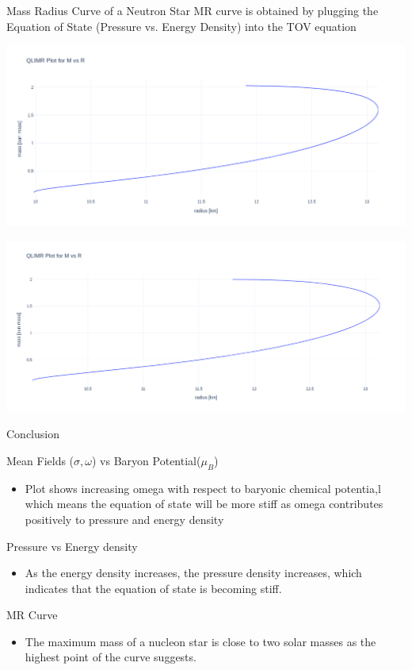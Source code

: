 \documentclass[12pt,aspectratio169]{beamer}
\begin{document}
\begin{frame}{Mass Radius Curve of a Neutron Star}
MR curve is obtained by plugging the Equation of State (Pressure vs. Energy Density) into the TOV equation\\
\vspace{1cm}
\begin{minipage}[t]{0.48\textwidth}
  \centering
  \includegraphics[width=0.9\linewidth]{MR1.png}
\end{minipage}
\hfill
\begin{minipage}[t]{0.48\textwidth}
  \centering
  \includegraphics[width=0.9\linewidth]{MR2.png}
\end{minipage}

\vspace{0.5cm}    
\end{frame}
    

\begin{frame}{Conclusion }
\begin{block}{}
Mean Fields ($\sigma, \omega $) vs Baryon Potential($\mu_B$)
\begin{itemize}
    \item Plot shows increasing omega with respect to baryonic chemical potentia,l which means the equation of state will be  more stiff as omega contributes positively to pressure and energy density
\end{itemize}
Pressure vs Energy density
\begin{itemize}
    \item As the energy density increases, the pressure density increases, which indicates that the equation of state is becoming stiff.
\end{itemize}
MR Curve
\begin{itemize}
    \item The maximum mass of a nucleon star is close to two solar masses as the highest point of the curve suggests.
\end{itemize}
\end{block}
\end{frame}



\end{document}
